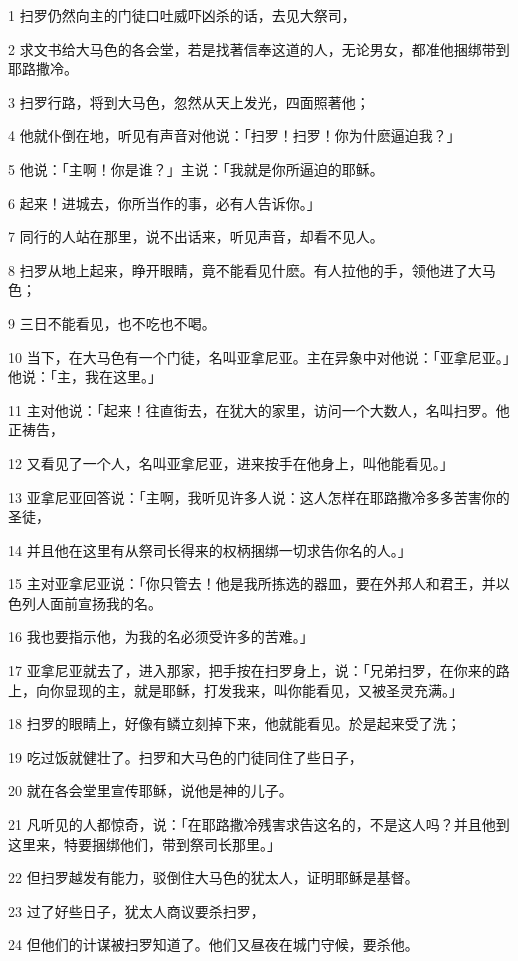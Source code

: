 \par 1 扫罗仍然向主的门徒口吐威吓凶杀的话，去见大祭司，
\par 2 求文书给大马色的各会堂，若是找著信奉这道的人，无论男女，都准他捆绑带到耶路撒冷。
\par 3 扫罗行路，将到大马色，忽然从天上发光，四面照著他；
\par 4 他就仆倒在地，听见有声音对他说：「扫罗！扫罗！你为什麽逼迫我？」
\par 5 他说：「主啊！你是谁？」主说：「我就是你所逼迫的耶稣。
\par 6 起来！进城去，你所当作的事，必有人告诉你。」
\par 7 同行的人站在那里，说不出话来，听见声音，却看不见人。
\par 8 扫罗从地上起来，睁开眼睛，竟不能看见什麽。有人拉他的手，领他进了大马色；
\par 9 三日不能看见，也不吃也不喝。
\par 10 当下，在大马色有一个门徒，名叫亚拿尼亚。主在异象中对他说：「亚拿尼亚。」他说：「主，我在这里。」
\par 11 主对他说：「起来！往直街去，在犹大的家里，访问一个大数人，名叫扫罗。他正祷告，
\par 12 又看见了一个人，名叫亚拿尼亚，进来按手在他身上，叫他能看见。」
\par 13 亚拿尼亚回答说：「主啊，我听见许多人说：这人怎样在耶路撒冷多多苦害你的圣徒，
\par 14 并且他在这里有从祭司长得来的权柄捆绑一切求告你名的人。」
\par 15 主对亚拿尼亚说：「你只管去！他是我所拣选的器皿，要在外邦人和君王，并以色列人面前宣扬我的名。
\par 16 我也要指示他，为我的名必须受许多的苦难。」
\par 17 亚拿尼亚就去了，进入那家，把手按在扫罗身上，说：「兄弟扫罗，在你来的路上，向你显现的主，就是耶稣，打发我来，叫你能看见，又被圣灵充满。」
\par 18 扫罗的眼睛上，好像有鳞立刻掉下来，他就能看见。於是起来受了洗；
\par 19 吃过饭就健壮了。扫罗和大马色的门徒同住了些日子，
\par 20 就在各会堂里宣传耶稣，说他是神的儿子。
\par 21 凡听见的人都惊奇，说：「在耶路撒冷残害求告这名的，不是这人吗？并且他到这里来，特要捆绑他们，带到祭司长那里。」
\par 22 但扫罗越发有能力，驳倒住大马色的犹太人，证明耶稣是基督。
\par 23 过了好些日子，犹太人商议要杀扫罗，
\par 24 但他们的计谋被扫罗知道了。他们又昼夜在城门守候，要杀他。
